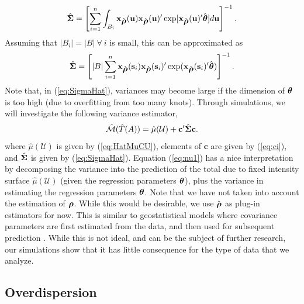 \documentclass[12pt, titlepage]{article}\usepackage[]{graphicx}\usepackage[]{color}
\newcommand{\bx}{\ensuremath{\mathbf{x}}}
\newcommand{\bs}{\ensuremath{\mathbf{s}}}
\newcommand{\bu}{\ensuremath{\mathbf{u}}}
\def\bc{\mathbf{c}}
\def\bs{\mathbf{s}}
\def\bu{\mathbf{u}}
\def\cU{\mathcal{U}}
\def\cM{\mathcal{M}}
\def\btheta{\mbox{\boldmath $\theta$}}
\def\brho{\mbox{\boldmath $\rho$}}
\def\bSigma{\mbox{\boldmath $\Sigma$}}
\begin{document}
\[
  \hat{\bSigma}= \left[\sum_{i=1}^n\int_{B_i} \bx_{\hat{\brho}}(\bu)\bx_{\hat{\brho}}({\bu})^\prime
    \exp[\bx_{\hat{\brho}}(\bu)^\prime \hat{\btheta}] d\bu\right]^{-1}.
\]
Assuming that $|B_i| = |B| \ \forall \ i$ is small, this can be approximated as
\begin{equation} \label{eq:SigmaHat}
  \hat{\bSigma} =  \left[ |B| \sum_{i=1}^{n} \bx_{\hat{\brho}}(\bs_i)\bx_{\hat{\brho}}({\bs_i})^\prime
    \exp(\bx_{\hat{\brho}}(\bs_i)^\prime \hat{\btheta}) \right]^{-1}.
\end{equation}
Note that, in (\ref{eq:SigmaHat}), variances may become large if the dimension of $\btheta$ is too high (due to overfitting from too many knots). Through simulations, we will investigate the following variance estimator,
\begin{equation} \label{eq:nu1}
  \hat{\cM}(\hat{T}(A)) = \hat{\mu}(\cU) + \bc^\prime\hat{\bSigma}\bc.
\end{equation}
where $\hat{\mu}(\cU)$ is given by (\ref{eq:HatMuCU}), elements of $\bc$ are given by (\ref{eq:ci}), and $\hat{\bSigma}$ is given by (\ref{eq:SigmaHat}).  Equation (\ref{eq:nu1}) has a nice interpretation by decomposing the variance into the prediction of the total due to fixed intensity surface $\hat{\mu}(\cU)$ (given the regression parameters $\btheta$), plus the variance in estimating the regression parameters $\btheta$.  Note that we have not taken into account the estimation of $\brho$.  While this would be desirable, we use $\hat{\brho}$ as plug-in estimators for now.  This is similar to geostatistical models where covariance parameters are first estimated from the data, and then used for subsequent prediction \citep[see, e.g.,][p. 263]{Scha:Gotw:stat:2005}.  While this is not ideal, and can be the subject of further research, our simulations show that it has little consequence for the type of data that we analyze.


\subsection{Overdispersion} \label{sec:overdispersion}
\end{document}
